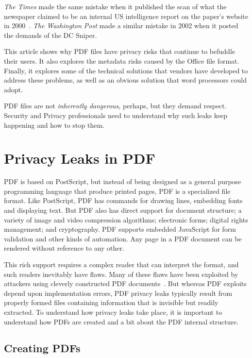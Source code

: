 \emph{The Times}  made the
same mistake when it published the scan of what the newspaper claimed
to be an internal US intelligence report on the paper's website in
2000~\cite{nyt-unediting-2003}. \emph{The Washington Post} made a
similar mistake in 2002 when it posted the demands of the DC
Sniper\cite{internet-forensics}.

This article shows
why PDF files have privacy risks that continue to befuddle their
users. It also explores the
metadata risks caused by the Office file format. Finally, it explores
some of the technical solutions that vendors have developed to address
these problems, as well as an obvious solution that 
word processors could adopt.

PDF files are not \emph{inherently dangerous}, perhaps, but they
demand respect. Security and Privacy professionals need to
understand why such leaks keep happening and how to stop them.

\section{Privacy Leaks in PDF}

PDF is based on PostScript, but instead of being designed as a general
purpose programming language that produce printed pages, PDF is a
specialized file format. Like PostScript, PDF has
commands for drawing lines, embedding fonts and displaying text. But PDF also has direct support for
document structure; a variety of image and video compression
algorithms; electronic forms; digital rights management; and
cryptography. PDF supports embedded JavaScript for form validation
and other kinds of automation. Any page in a PDF document can be
rendered without reference to any other. 

This rich support requires a complex reader that can interpret the
format, and such readers inevitably have flaws. Many of these flaws
have been exploited by attackers using cleverly constructed
PDF documents~\cite{5705599}. But whereas PDF exploits depend upon
implementation errors, PDF privacy leaks typically result from
properly formed files  containing information that is invisible but
readily extracted. To understand how privacy leaks take place, it
is important to understand how PDFs are created and a bit
about the PDF internal structure.

\subsection{Creating PDFs}

